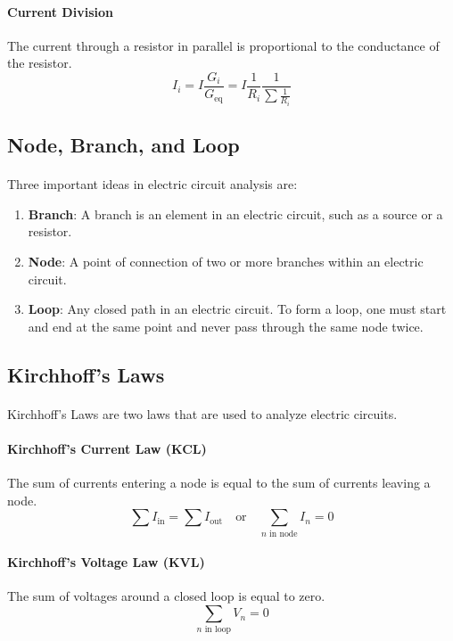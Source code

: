 \documentclass[11pt]{report}
\begin{document}
\paragraph{Current Division} The current through a resistor in parallel is proportional to the conductance of the resistor.
\begin{equation}
    I_i = I \frac{G_i}{G_{\text{eq}}} = I \frac{1}{R_i} \frac{1}{\sum \frac{1}{R_i}}
\end{equation}
\subsection{Node, Branch, and Loop}
\paragraph{} Three important ideas in electric circuit analysis are:
\begin{enumerate}
    \item \textbf{Branch}: A branch is an element in an electric circuit, such as a source or a resistor.
    \item \textbf{Node}: A point of connection of two or more branches within an electric circuit.
    \item \textbf{Loop}: Any closed path in an electric circuit. To form a loop, one must start and end at the same point and never pass through the same node twice.
\end{enumerate}
\subsection{Kirchhoff's Laws}
\paragraph{} Kirchhoff's Laws are two laws that are used to analyze electric circuits.
\paragraph{Kirchhoff's Current Law (KCL)} The sum of currents entering a node is equal to the sum of currents leaving a node.
\begin{equation}
    \sum I_{\text{in}} = \sum I_{\text{out}} \quad \text{or} \quad \sum_\text{$n$ in node} I_n = 0
\end{equation}
\paragraph{Kirchhoff's Voltage Law (KVL)} The sum of voltages around a closed loop is equal to zero.
\begin{equation}
    \sum_\text{$n$ in loop} V_{n} = 0
\end{equation}
\end{document}

